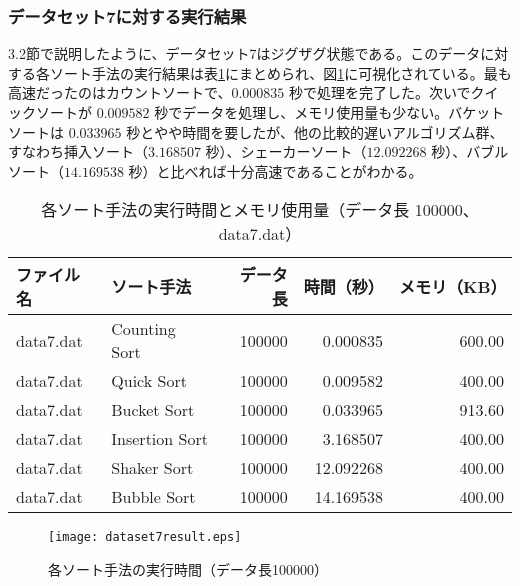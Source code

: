 \documentclass[a4j, 11pt]{jarticle}
\begin{document}
\subsubsection{データセット7に対する実行結果}
3.2節で説明したように、データセット7はジグザグ状態である。このデータに対する各ソート手法の実行結果は表\ref{dataset7allresult}にまとめられ、図\ref{dataset7allresultgraph}に可視化されている。最も高速だったのはカウントソートで、$0.000835$ 秒で処理を完了した。次いでクイックソートが $0.009582$ 秒でデータを処理し、メモリ使用量も少ない。バケットソートは $0.033965$ 秒とやや時間を要したが、他の比較的遅いアルゴリズム群、すなわち挿入ソート（$3.168507$ 秒）、シェーカーソート（$12.092268$ 秒）、バブルソート（$14.169538$ 秒）と比べれば十分高速であることがわかる。
\begin{table}[H]
  \centering
  \caption{各ソート手法の実行時間とメモリ使用量（データ長 100000、data7.dat）}\label{dataset7allresult}
  \begin{tabular}{|l|l|r|r|r|}
    \hline
    \textbf{ファイル名} & \textbf{ソート手法} & \textbf{データ長} & \textbf{時間（秒）} & \textbf{メモリ（KB）} \\
    \hline
    data7.dat & Counting Sort  & 100000 & 0.000835  & 600.00 \\
    data7.dat & Quick Sort     & 100000 & 0.009582  & 400.00 \\
    data7.dat & Bucket Sort    & 100000 & 0.033965  & 913.60 \\
    data7.dat & Insertion Sort & 100000 & 3.168507  & 400.00 \\
    data7.dat & Shaker Sort    & 100000 & 12.092268 & 400.00 \\
    data7.dat & Bubble Sort    & 100000 & 14.169538 & 400.00 \\
    \hline
  \end{tabular}
\end{table}
\begin{figure}[H]
  \centering
  \texttt{[image: dataset7result.eps]}
  \caption{各ソート手法の実行時間（データ長100000）}\label{dataset7allresultgraph}
\end{figure}
\end{document}

